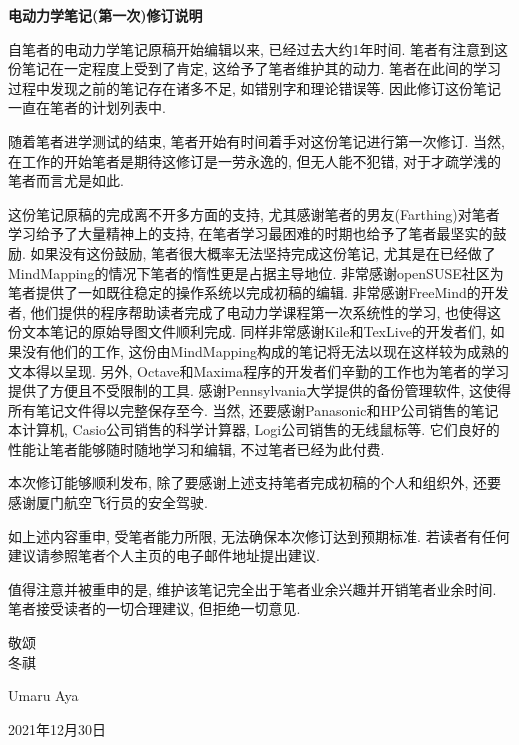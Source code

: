 


 \begin{center} 
 \Large \textbf{电动力学笔记(第一次)修订说明}
\end{center}
 
\large 
\quad 自笔者的电动力学笔记原稿开始编辑以来, 已经过去大约1年时间. 笔者有注意到这份笔记在一定程度上受到了肯定, 这给予了笔者维护其的动力. 笔者在此间的学习过程中发现之前的笔记存在诸多不足, 如错别字和理论错误等. 因此修订这份笔记一直在笔者的计划列表中. \par

\quad 随着笔者进学测试的结束, 笔者开始有时间着手对这份笔记进行第一次修订. 当然, 在工作的开始笔者是期待这修订是一劳永逸的, 但无人能不犯错, 对于才疏学浅的笔者而言尤是如此.\par

\quad 这份笔记原稿的完成离不开多方面的支持, 尤其感谢笔者的男友(Farthing)对笔者学习给予了大量精神上的支持, 在笔者学习最困难的时期也给予了笔者最坚实的鼓励. 如果没有这份鼓励, 笔者很大概率无法坚持完成这份笔记, 尤其是在已经做了MindMapping的情况下笔者的惰性更是占据主导地位. 非常感谢openSUSE社区为笔者提供了一如既往稳定的操作系统以完成初稿的编辑. 非常感谢FreeMind的开发者, 他们提供的程序帮助读者完成了电动力学课程第一次系统性的学习, 也使得这份文本笔记的原始导图文件顺利完成. 同样非常感谢Kile和TexLive的开发者们, 如果没有他们的工作, 这份由MindMapping构成的笔记将无法以现在这样较为成熟的文本得以呈现. 另外, Octave和Maxima程序的开发者们辛勤的工作也为笔者的学习提供了方便且不受限制的工具. 感谢Pennsylvania大学提供的备份管理软件, 这使得所有笔记文件得以完整保存至今. 当然, 还要感谢Panasonic和HP公司销售的笔记本计算机, Casio公司销售的科学计算器, Logi公司销售的无线鼠标等. 它们良好的性能让笔者能够随时随地学习和编辑, 不过笔者已经为此付费.\par

\quad 本次修订能够顺利发布, 除了要感谢上述支持笔者完成初稿的个人和组织外, 还要感谢厦门航空飞行员的安全驾驶. \par

\quad 如上述内容重申, 受笔者能力所限, 无法确保本次修订达到预期标准. 若读者有任何建议请参照笔者个人主页的电子邮件地址提出建议. \par

\quad 值得注意并被重申的是, 维护该笔记完全出于笔者业余兴趣并开销笔者业余时间. 笔者接受读者的一切合理建议, 但拒绝一切意见. \par

\quad \par

\quad 敬颂 \\
冬祺\par

\quad\par
\quad\par

\quad Umaru Aya\par
2021年12月30日\par


